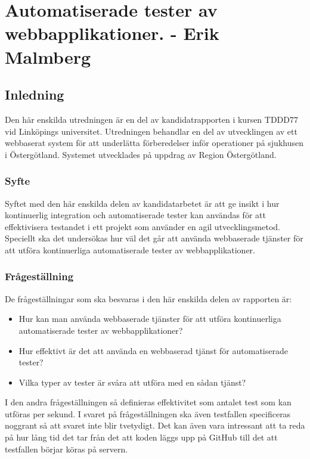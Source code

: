 \section{Automatiserade tester av webbapplikationer. - Erik Malmberg}
\subsection{Inledning}
Den här enskilda utredningen är en del av kandidatrapporten i kursen TDDD77 vid Linköpings universitet.
Utredningen behandlar en del av utvecklingen av ett webbaserat system för att underlätta förberedelser
inför operationer på sjukhusen i Östergötland. Systemet utvecklades på uppdrag av Region Östergötland.

\subsubsection{Syfte}
Syftet med den här enskilda delen av kandidatarbetet är att ge insikt 
i hur kontinuerlig integration och 
automatiserade tester kan användas för att effektivisera testandet 
i ett projekt som använder en agil 
utvecklingsmetod. Speciellt ska det undersökas hur väl det går att använda 
webbaserade tjänster för
att utföra kontinuerliga automatiserade tester av webbapplikationer.

\subsubsection{Frågeställning}
De frågeställningar som ska besvaras i den här enskilda 
delen av rapporten är:

\begin{itemize}
\item Hur kan man använda webbaserade tjänster för
att utföra kontinuerliga automatiserade tester av webbapplikationer?
\item Hur effektivt är det att använda en webbaserad tjänst
för automatiserade tester? 
\item Vilka typer av tester är svåra att utföra med en sådan tjänst?
\end{itemize}

I den andra frågeställningen så definieras effektivitet som antalet test som kan
utföras per sekund. I svaret på frågeställningen ska även testfallen 
specificeras noggrant så att svaret inte blir tvetydigt. Det kan även vara
intressant att ta reda på hur lång tid det tar från det att koden läggs 
upp på GitHub
till det att testfallen börjar köras på servern.

